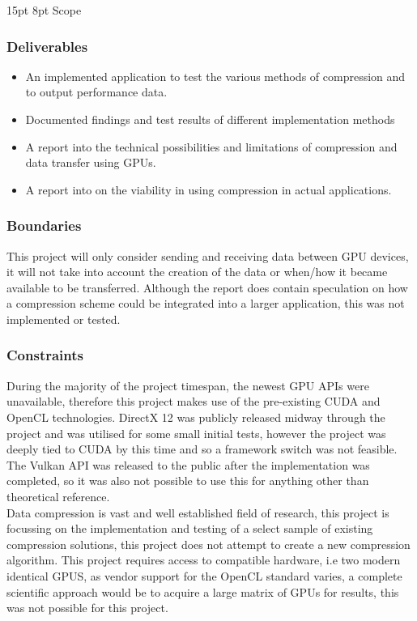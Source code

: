 \documentclass[12pt,a4paper]{article}
\makeatletter
\renewcommand\subsection{\@startsection {subsection}{1}{2mm} %
                               {15pt} %
                               {8pt} %
                               {\fontsize{13pt}{1em}\bfseries}}
\makeatother
\begin{document}
\subsection{Scope}
	\subsubsection{Deliverables}
		\begin{itemize}
		\item An implemented application to test the various methods of compression and to output performance data.
		\item Documented findings and test results of different implementation methods
		\item A report into the technical possibilities and limitations of compression and data transfer using GPUs.
		\item  A report into on the viability in using compression in actual applications.
		\end{itemize}
\subsubsection{Boundaries}
This project will only consider sending and receiving data between GPU devices, it will not take into account the creation of the data or when/how it became available to be transferred. Although the report does contain speculation on how a compression scheme could be integrated into a larger application, this was not implemented or tested.

\subsubsection{Constraints}
During the majority of  the project timespan, the newest GPU APIs were unavailable, therefore this project makes use of the pre-existing CUDA and OpenCL technologies. DirectX 12 was publicly released midway through the project and was utilised for some small initial tests, however the project was deeply tied to CUDA by this time and so a framework switch was not feasible. The Vulkan API was released to the public after the implementation was completed, so it was also not possible to use this for anything other than theoretical reference.
\\
Data compression is vast and well established field of research, this project is focussing on the implementation and testing of a select sample of existing compression solutions, this project does not attempt to create a new compression algorithm.
This project requires access to compatible hardware, i.e two modern identical GPUS, as vendor support for the OpenCL standard varies, a complete scientific approach would be to acquire a large matrix of GPUs for results, this was not possible for this project.
	
\end{document}
